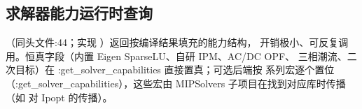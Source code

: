 \subsection{求解器能力运行时查询}\label{subsec:overview-capabilities}


（同头文件:44；实现
）返回按编译结果填充的能力结构，
开销极小、可反复调用。恒真字段（内置 Eigen SparseLU、自研 IPM、AC/DC OPF、
三相潮流、二次目标）在 :get\_solver\_capabilities 直接置真；可选后端按
 系列宏逐个置位（:get\_solver\_capabilities），这些宏由
MIPSolvers 子项目在找到对应库时传播（如
 对 Ipopt 的传播）。


